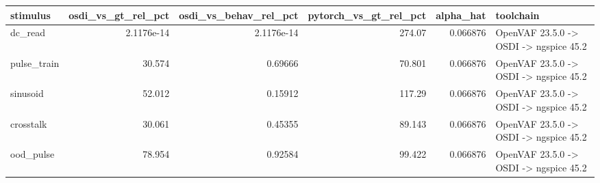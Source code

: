 \begin{tabular}{lrrrrl}
\toprule
stimulus & osdi_vs_gt_rel_pct & osdi_vs_behav_rel_pct & pytorch_vs_gt_rel_pct & alpha_hat & toolchain \\
\midrule
dc_read & 2.1176e-14 & 2.1176e-14 & 274.07 & 0.066876 & OpenVAF 23.5.0 -> OSDI -> ngspice 45.2 \\
pulse_train & 30.574 & 0.69666 & 70.801 & 0.066876 & OpenVAF 23.5.0 -> OSDI -> ngspice 45.2 \\
sinusoid & 52.012 & 0.15912 & 117.29 & 0.066876 & OpenVAF 23.5.0 -> OSDI -> ngspice 45.2 \\
crosstalk & 30.061 & 0.45355 & 89.143 & 0.066876 & OpenVAF 23.5.0 -> OSDI -> ngspice 45.2 \\
ood_pulse & 78.954 & 0.92584 & 99.422 & 0.066876 & OpenVAF 23.5.0 -> OSDI -> ngspice 45.2 \\
\bottomrule
\end{tabular}
